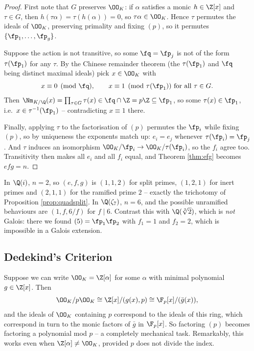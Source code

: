 \begin{proof}
	First note that $G$ preserves $\OO_K$: if $\alpha$ satisfies a monic $h \in \Z[x]$ and $\tau \in G$, then $h(\tau\alpha) = \tau(h(\alpha)) = 0$, so $\tau\alpha \in \OO_K$. Hence $\tau$ permutes the ideals of $\OO_K$, preserving primality and fixing $(p)$, so it permutes $\{\fp_1,\dots,\fp_g\}$.

	Suppose the action is not transitive, so some $\fq = \fp_j$ is not of the form $\tau(\fp_1)$ for any $\tau$. By the Chinese remainder theorem (the $\tau(\fp_1)$ and $\fq$ being distinct maximal ideals) pick $x \in \OO_K$ with
	$$x \equiv 0 \pmod{\fq}, \qquad x \equiv 1 \pmod{\tau(\fp_1)} \text{ for all } \tau \in G.$$
	Then $\Nm_{K/\Q}(x) = \prod_{\tau\in G}\tau(x) \in \fq \cap \Z = p\Z \subseteq \fp_1$, so some $\tau(x) \in \fp_1$, i.e.\ $x \in \tau^{-1}(\fp_1)$ -- contradicting $x \equiv 1$ there.

	Finally, applying $\tau$ to the factorisation of $(p)$ permutes the $\fp_i$ while fixing $(p)$, so by uniqueness the exponents match up: $e_i = e_j$ whenever $\tau(\fp_i) = \fp_j$. And $\tau$ induces an isomorphism $\OO_K/\fp_i \to \OO_K/\tau(\fp_i)$, so the $f_i$ agree too. Transitivity then makes all $e_i$ and all $f_i$ equal, and Theorem \ref{thm:efg} becomes $efg = n$.
\end{proof}

\begin{example}
	In $\Q(i)$, $n = 2$, so $(e,f,g)$ is $(1,1,2)$ for split primes, $(1,2,1)$ for inert primes and $(2,1,1)$ for the ramified prime $2$ -- exactly the trichotomy of Proposition \ref{prop:quadsplit}. In $\Q(\zeta_7)$, $n=6$, and the possible unramified behaviours are $(1,f,6/f)$ for $f \mid 6$. Contrast this with $\Q(\sqrt[3]2)$, which is \emph{not} Galois: there we found $(5) = \fp_1\fp_2$ with $f_1 = 1$ and $f_2 = 2$, which is impossible in a Galois extension.
\end{example}

\subsection{Dedekind's Criterion}

Suppose we can write $\OO_K = \Z[\alpha]$ for some $\alpha$ with minimal polynomial $g \in \Z[x]$. Then
$$\OO_K/p\OO_K \cong \Z[x]/(g(x), p) \cong \F_p[x]/(\bar g(x)),$$
and the ideals of $\OO_K$ containing $p$ correspond to the ideals of this ring, which correspond in turn to the monic factors of $\bar g$ in $\F_p[x]$. So factoring $(p)$ becomes factoring a polynomial mod $p$ -- a completely mechanical task. Remarkably, this works even when $\Z[\alpha] \neq \OO_K$, provided $p$ does not divide the index.

